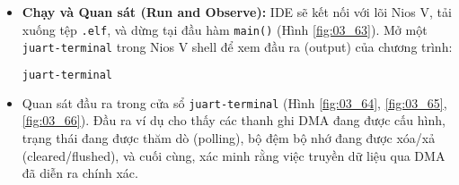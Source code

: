 \begin{enumerate}
\begin{itemize}
\begin{itemize}
        \end{itemize}
        \item \textbf{Chạy và Quan sát (Run and Observe):} IDE sẽ kết nối với lõi Nios V, tải xuống tệp \texttt{.elf}, và dừng tại đầu hàm \texttt{main()} (Hình \ref{fig:03_63}). Mở một \texttt{juart-terminal} trong Nios V shell để xem đầu ra (output) của chương trình:
        \begin{lstlisting}[language=bash, caption={Khởi chạy JTAG UART Terminal}, label=lst:juart]
juart-terminal \end{lstlisting}
        \item Quan sát đầu ra trong cửa sổ \texttt{juart-terminal} (Hình \ref{fig:03_64}, \ref{fig:03_65}, \ref{fig:03_66}). Đầu ra ví dụ cho thấy các thanh ghi DMA đang được cấu hình, trạng thái đang được thăm dò (polling), bộ đệm bộ nhớ đang được xóa/xả (cleared/flushed), và cuối cùng, xác minh rằng việc truyền dữ liệu qua DMA đã diễn ra chính xác.
    \end{itemize}
\end{enumerate}

